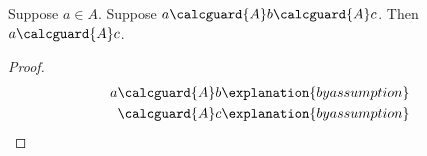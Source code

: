 

\begin{proposition}\label{calculation_exhausted_condition}
    Suppose $a\in A$.
    Suppose $a\calcguard{A}b\calcguard{A}c$.
    Then $a\calcguard{A}c$.
\end{proposition}
\begin{proof}
    \begin{align*} a &\calcguard{A}b \explanation{by assumption} \\ &\calcguard{A}c \explanation{by assumption} \end{align*}
\end{proof}

